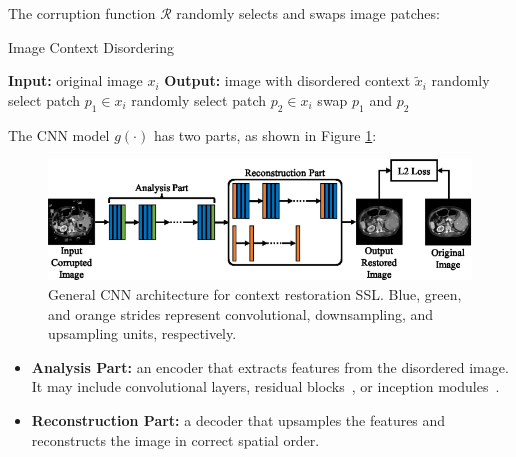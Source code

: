 \documentclass{article}
\begin{document}
The corruption function $\mathcal{R}$ randomly selects and swaps image patches:

\begin{algorithm}[H]
    \caption{Image Context Disordering}
    \begin{algorithmic}[1]
    \STATE \textbf{Input:} original image $x_i$
    \STATE \textbf{Output:} image with disordered context $\tilde{x}_i$
      \STATE randomly select patch $p_1 \in x_i$
      \STATE randomly select patch $p_2 \in x_i$
        \STATE swap $p_1$ and $p_2$
      \ENDIF
    \ENDFOR
    \end{algorithmic}
\end{algorithm}


The CNN model $g(\cdot)$ has two parts, as shown in Figure \ref{fig:context_restoration_architecture}:

\begin{figure}[htb]
    \centering
    \includegraphics[width=0.98\linewidth]{images/General_CNN_architecture_for_the_context_restoration_self_supervised_learning.pdf}
    \caption{General CNN architecture for context restoration SSL. Blue, green, and orange strides represent convolutional, downsampling, and upsampling units, respectively.}
    \label{fig:context_restoration_architecture}
\end{figure}

\begin{itemize}
    \item \textbf{Analysis Part:} an encoder that extracts features from the disordered image. It may include convolutional layers, residual blocks~\cite{He2015DeepRL}, or inception modules~\cite{Szegedy2015RethinkingTI}.
    \item \textbf{Reconstruction Part:} a decoder that upsamples the features and reconstructs the image in correct spatial order.
\end{itemize}
\end{document}
